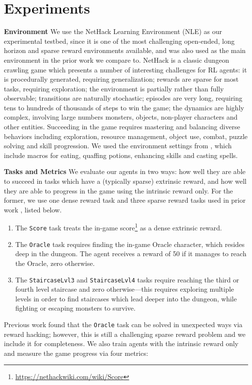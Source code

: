 \section{Experiments}
\label{sec:expr}
\textbf{Environment} We use the NetHack Learning Environment (NLE) \citep{kuettler2020nethack} as our experimental testbed, since it is one of the most challenging open-ended, long horizon and sparse reward environments available, and was also used as the main environment in the prior work we compare to. NetHack is a classic dungeon crawling game which presents a number of interesting challenges for RL agents: it is procedurally generated, requiring generalization; rewards are sparse for most tasks, requiring exploration; the environment is partially rather than fully observable; transitions are naturally stochastic; episodes are very long, requiring tens to hundreds of thousands of steps to win the game; the dynamics are highly complex, involving large numbers monsters, objects, non-player characters and other entities. Succeeding in the game requires mastering and balancing diverse behaviors including exploration, resource management, object use, combat, puzzle solving and skill progression. We used the environment settings from \citep{klissarov2024maestromotif}, which include macros for eating, quaffing potions, enhancing skills and casting spells. 

\textbf{Tasks and Metrics} 
We evaluate our agents in two ways: how well they are able to succeed in tasks which have a (typically sparse) extrinsic reward, and how well they are able to progress in the game using the intrinsic reward only. For the former, we use one dense reward task and three sparse reward tasks used in prior work \citep{kuettler2020nethack, klissarovdoro2023motif}, listed below.
\begin{enumerate}[topsep=0pt, itemsep=0pt]
    \item The \texttt{Score} task treats the in-game score\footnote{\url{https://nethackwiki.com/wiki/Score}} as a dense extrinsic reward.
    \item The \texttt{Oracle} task requires finding the in-game Oracle character, which resides deep in the dungeon. The agent receives a reward of 50 if it manages to reach the Oracle, zero otherwise. 
    \item The \texttt{StaircaseLvl3} and \texttt{StaircaseLvl4} tasks require reaching the third or fourth level staircase and zero otherwise---this requires exploring multiple levels in order to find staircases which lead deeper into the dungeon, while fighting or escaping monsters to survive. 
\end{enumerate}
%
Previous work found that the \texttt{Oracle} task can be solved in unexpected ways via reward hacking; however, this is still a challenging sparse reward problem and we include it for completeness. 
We also train agents with the intrinsic reward only and measure the game progress via four metrics: 

